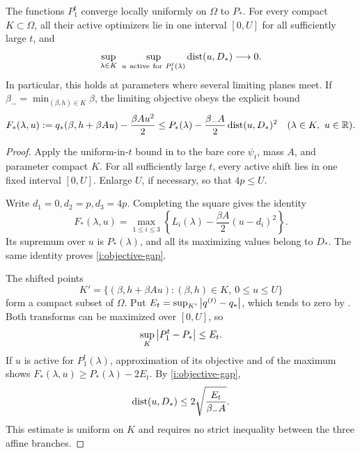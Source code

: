 \begin{lemma}
\label{i:limiting-transform}
The functions \(P_1^t\) converge locally uniformly on \(\Omega\) to
\(P_*\).  For every compact \(K\subset\Omega\), all their active
optimizers lie in one interval \([0,U]\) for all sufficiently large
\(t\), and
\[
 \sup_{\lambda\in K}\ \sup_{u\ \mathrm{active\ for}\ P_1^t(\lambda)}
       \dist(u,D_*)\longrightarrow0.
\]
In particular, this holds at parameters where several limiting planes
meet.  If \(\beta_-=\min_{(\beta,h)\in K}\beta\), the limiting
objective obeys the explicit bound
\begin{equation}
 F_*(\lambda,u):=q_*(\beta,h+\beta Au)-\frac{\beta A u^2}{2}
 \le P_*(\lambda)-\frac{\beta_-A}{2}\operatorname{dist}(u,D_*)^2
 \quad(\lambda\in K,\ u\in\mathbb R).
 \label{i:objective-gap}
\end{equation}
\end{lemma}

\begin{proof}
Apply the uniform-in-\(t\) bound in  to
the bare core \(\psi_t\), mass \(A\), and parameter compact \(K\).
For all sufficiently large \(t\), every active shift lies in one fixed
interval \([0,U]\).  Enlarge \(U\), if necessary, so that \(4p\le U\).

Write \(d_1=0,d_2=p,d_3=4p\).  Completing the square gives the identity
\begin{equation}
 F_*(\lambda,u)
 =\max_{1\le i\le3}
       \left\{L_i(\lambda)-\frac{\beta A}{2}(u-d_i)^2\right\}.
 \label{i:limiting-parabolas}
\end{equation}
Its supremum over \(u\) is \(P_*(\lambda)\), and all its maximizing
values belong to \(D_*\).  The same identity proves
\eqref{i:objective-gap}.

The shifted points
\[
 K'=\{(\beta,h+\beta Au):(\beta,h)\in K,\ 0\le u\le U\}
\]
form a compact subset of \(\Omega\).  Put
\(E_t=\sup_{K'}\left|q^{(t)}-q_*\right|\), which tends to zero by
.  Both transforms can be maximized over
\([0,U]\), so
\[
 \sup_K\left|P_1^t-P_*\right|\le E_t.
\]
If \(u\) is active for \(P_1^t(\lambda)\), approximation of its
objective and of the maximum shows
\(F_*(\lambda,u)\ge P_*(\lambda)-2E_t\).  By
\eqref{i:objective-gap},
\begin{equation}
 \operatorname{dist}(u,D_*)
 \le 2\sqrt{\frac{E_t}{\beta_-A}}.
 \label{i:active-density-error}
\end{equation}
This estimate is uniform on \(K\) and requires no strict inequality
between the three affine branches.
\end{proof}

